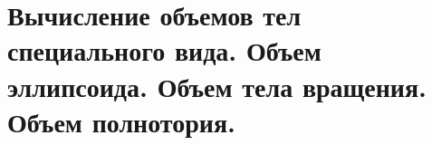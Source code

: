 \documentclass[../main.tex]{subfiles}
\begin{document}
\newpage
\section{Вычисление объемов тел специального вида. Объем эллипсоида. Объем тела вращения. Объем полнотория.}
\end{document}
